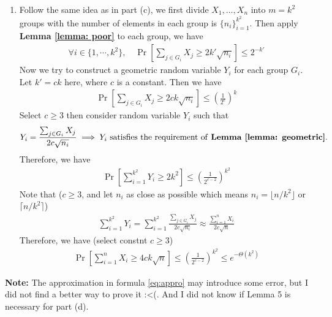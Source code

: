 \begin{answer}
\begin{enumerate}[label=\alph*).]
        \item Follow the same idea as in part (c), we first divide $X_1, \dots, X_n$ into $m = k^2$ groups with the number of elements in each group is $\{n_i\}_{i=1}^{k^2}$.
        Then apply \textbf{Lemma \ref{lemma: poor}} to each group, we have
        \begin{align*}
            \forall i \in \{1, \cdots, k^2\},\quad  \Pr\left[\sum_{j\in G_i} X_j \ge 2k'\sqrt{n_i}\right] \le 2^{-k'}
        \end{align*}
        Now we try to construct a geometric random variable $Y_i$ for each group $G_i$. Let $k' = ck$ here, where $c$ is a constant. 
        Then we have
        \begin{align*}
            \Pr\left[\sum_{j\in G_i} X_j \ge 2ck\sqrt{n_i}\right] \le \left(\frac{1}{2^c}\right)^k
        \end{align*}
        Select $c \ge 3$ then consider random variable $Y_i$ such that
        \begin{align*}
            Y_i = \frac{\sum_{j\in G_i} X_j} {2c\sqrt{n_i}} \implies Y_i \text{ satisfies the requirement of \textbf{Lemma \ref{lemma: geometric}}}.
        \end{align*}
        Therefore, we have
        \begin{align*}
            \Pr\left[\sum_{i=1}^{k^2} Y_i \ge 2k^2\right] \le \left(\frac{1}{2^{c-2}}\right)^{k^2}
        \end{align*}
        Note that ($c \ge 3$, and let $n_i$ as close as possible which means $n_i = \lfloor n/k^2 \rfloor $ or $\lceil n/k^2 \rceil$)
        \begin{align}
            \label{eq:appro}
            \sum_{i=1}^{k^2} Y_i = \sum_{i=1}^{k^2} \frac{\sum_{j\in G_i} X_j} {2c\sqrt{n_i}} \approx  \frac{\sum_{i=1}^{n} X_i }{2c\sqrt{n}}  
        \end{align}
        Therefore, we have (select constnt $c \ge 3$)
        \begin{align*}
            \Pr\left[\sum_{i=1}^{n} X_i \ge 4ck \sqrt{n}\right] \le \left(\frac{1}{2^{c-2}}\right)^{k^2} \le e^{-\Theta(k^2)} 
        \end{align*}
        \ed
    \end{enumerate}
    \textbf{Note:} The approximation in formula \eqref{eq:appro} may introduce some error, but I did not find a better way to prove it :<(. And I did not know if Lemma 5 is necessary for part (d).
\end{answer}